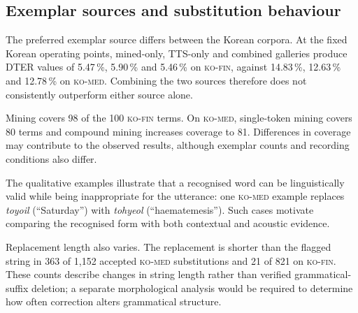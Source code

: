 \documentclass{article}
\newcommand{\corpA}{\textsc{ko-fin}}
\newcommand{\corpB}{\textsc{ko-med}}
\begin{document}
\subsection{Exemplar sources and substitution behaviour}
\label{sec:source}

The preferred exemplar source differs between the Korean corpora. At the fixed
Korean operating points, mined-only, TTS-only and combined galleries produce
DTER values of 5.47\,\%, 5.90\,\% and 5.46\,\% on \corpA{}, against 14.83\,\%,
12.63\,\% and 12.78\,\% on \corpB{}. Combining the two sources therefore does
not consistently outperform either source alone.

Mining covers 98 of the 100 \corpA{} terms. On \corpB{}, single-token mining
covers 80 terms and compound mining increases coverage to 81. Differences in
coverage may contribute to the observed results, although exemplar counts and
recording conditions also differ.

The qualitative examples illustrate that a recognised word can be linguistically valid while being inappropriate for the utterance: one \corpB{} example replaces \emph{toyoil} (``Saturday'') with \emph{tohyeol} (``haematemesis''). Such cases motivate comparing the recognised form with both contextual and acoustic evidence.

Replacement length also varies. The replacement is shorter than the flagged string in 363 of 1{,}152 accepted \corpB{} substitutions and 21 of 821 on \corpA{}. These counts describe changes in string length rather than verified grammatical-suffix deletion; a separate morphological analysis would be required to determine how often correction alters grammatical structure.





\end{document}
